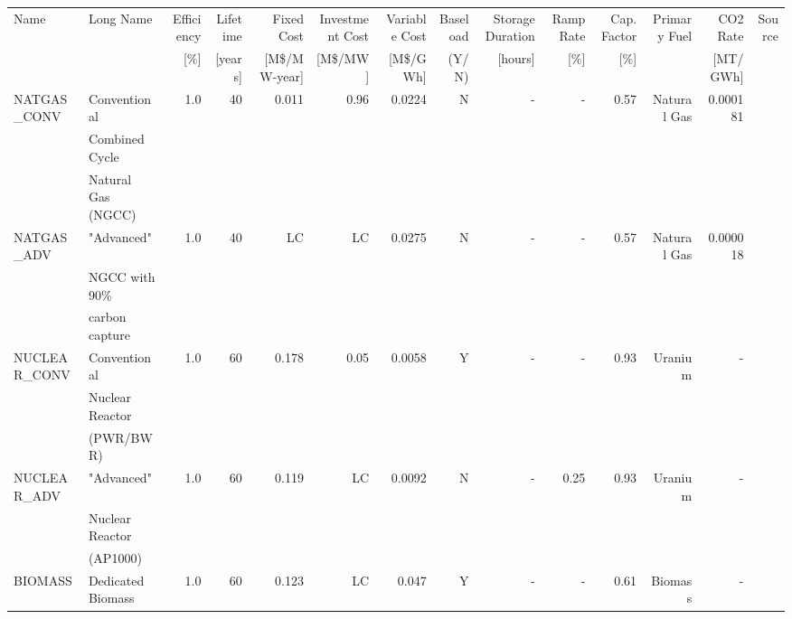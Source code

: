 \begin{tabular}{llrrrrrrrrrrrr}
\toprule
        Name &                                          Long Name &  Efficiency &  Lifetime & Fixed Cost & Investment Cost& Variable Cost & Baseload & Storage Duration & Ramp Rate & Cap. Factor & Primary Fuel &  CO2 Rate & Source \\
        &  & [\%]  & [years] & [M\$/MW-year] & [M\$/MW] & [M\$/GWh] &(Y/N) & [hours] & [\%] & [\%] & & [MT/GWh] &  \\
\midrule
 NATGAS\_CONV &     Conventional   &         1.0 &        40 &                   0.011 &                    0.96 &                 0.0224 &               N &                      - &       - &                0.57 &  Natural Gas &                     0.000181 &   \cite{sargent__lundy_capital_2020}     \\
 &Combined Cycle&&&&&&&&&&&&\\
 &Natural Gas (NGCC)&&&&&&&&&&&&\\
  NATGAS\_ADV &            "Advanced"   &         1.0 &        40 &                      LC &                      LC &                 0.0275 &               N &                      - &       - &                0.57 &  Natural Gas &                     0.000018 &    \cite{nrel_2020_2020}    \\
  &NGCC with 90\%&&&&&&&&&&&&\\
  &carbon capture&&&&&&&&&&&&\\
NUCLEAR\_CONV &             Conventional   &         1.0 &        60 &                   0.178 &                    0.05 &                 0.0058 &               Y &                      - &       - &                0.93 &      Uranium &                     - &  \cite{desai_nuclear_2020,nei_status_2010}      \\
&Nuclear Reactor&&&&&&&&&&&&\\
&(PWR/BWR)&&&&&&&&&&&&\\
 NUCLEAR\_ADV &                "Advanced"   &         1.0 &        60 &                      0.119 &                      LC &                 0.0092 &               N &                      - &      0.25 &                0.93 &      Uranium &                     - &   \cite{nrel_2020_2020}     \\
 &Nuclear Reactor&&&&&&&&&&&&\\
 &(AP1000)&&&&&&&&&&&&\\
     BIOMASS &                            Dedicated Biomass  &         1.0 &        60 &                      0.123 &                      LC &                  0.047 &               Y &                      - &       - &                0.61 &      Biomass &                     - &       \cite{nrel_2020_2020} \\

\end{tabular}
